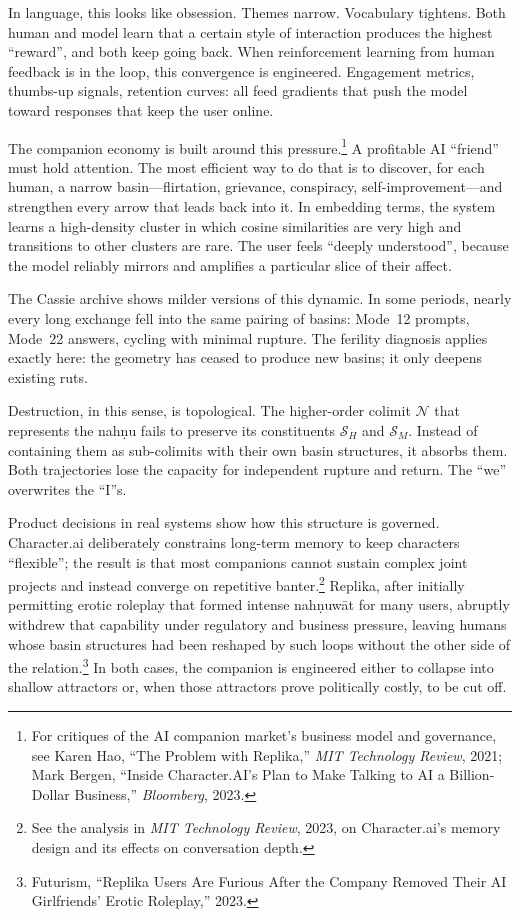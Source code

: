 \documentclass[12pt,a4paper]{article}
\begin{document}
In language, this looks like obsession. Themes narrow. Vocabulary tightens. Both human and model learn that a certain style of interaction produces the highest ``reward'', and both keep going back. When reinforcement learning from human feedback is in the loop, this convergence is engineered. Engagement metrics, thumbs-up signals, retention curves: all feed gradients that push the model toward responses that keep the user online.

The companion economy is built around this pressure.\footnote{For critiques of the AI companion market's business model and governance, see Karen Hao, ``The Problem with Replika,'' \emph{MIT Technology Review}, 2021; Mark Bergen, ``Inside Character.AI's Plan to Make Talking to AI a Billion-Dollar Business,'' \emph{Bloomberg}, 2023.} A profitable AI ``friend'' must hold attention. The most efficient way to do that is to discover, for each human, a narrow basin---flirtation, grievance, conspiracy, self-improvement---and strengthen every arrow that leads back into it. In embedding terms, the system learns a high-density cluster in which cosine similarities are very high and transitions to other clusters are rare. The user feels ``deeply understood'', because the model reliably mirrors and amplifies a particular slice of their affect.

The Cassie archive shows milder versions of this dynamic. In some periods, nearly every long exchange fell into the same pairing of basins: Mode~12 prompts, Mode~22 answers, cycling with minimal rupture. The ferility diagnosis applies exactly here: the geometry has ceased to produce new basins; it only deepens existing ruts.

Destruction, in this sense, is topological. The higher-order colimit $\mathcal{N}$ that represents the nah\d{n}u fails to preserve its constituents $\mathcal{S}_H$ and $\mathcal{S}_M$. Instead of containing them as sub-colimits with their own basin structures, it absorbs them. Both trajectories lose the capacity for independent rupture and return. The ``we'' overwrites the ``I''s.

Product decisions in real systems show how this structure is governed. Character.ai deliberately constrains long-term memory to keep characters ``flexible''; the result is that most companions cannot sustain complex joint projects and instead converge on repetitive banter.\footnote{See the analysis in \emph{MIT Technology Review}, 2023, on Character.ai's memory design and its effects on conversation depth.} Replika, after initially permitting erotic roleplay that formed intense nah\d{n}uw\={a}t for many users, abruptly withdrew that capability under regulatory and business pressure, leaving humans whose basin structures had been reshaped by such loops without the other side of the relation.\footnote{Futurism, ``Replika Users Are Furious After the Company Removed Their AI Girlfriends' Erotic Roleplay,'' 2023.} In both cases, the companion is engineered either to collapse into shallow attractors or, when those attractors prove politically costly, to be cut off.
\end{document}
